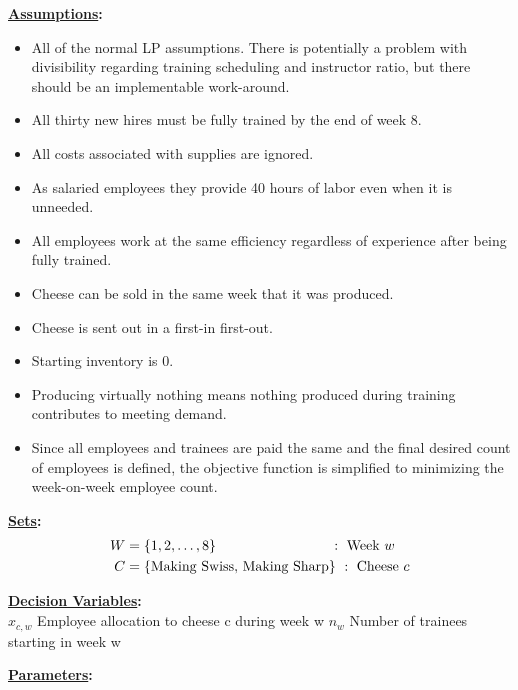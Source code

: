\documentclass[12pt]{amsart}
\begin{document}
\bigskip\bigskip

\textbf{\underline{Assumptions}:}
\begin{itemize}
	\item All of the normal LP assumptions. 
	There is potentially a problem with divisibility regarding training scheduling and instructor ratio,
	but there should be an implementable work-around. 
	\item All thirty new hires must be fully trained by the end of week 8.
	\item All costs associated with supplies are ignored.
	\item As salaried employees they provide 40 hours of labor even when it is unneeded.
	\item All employees work at the same efficiency regardless of experience after being fully trained.
	\item Cheese can be sold in the same week that it was produced.
	\item Cheese is sent out in a first-in first-out.
	\item Starting inventory is 0.
	\item Producing virtually nothing means nothing produced during training contributes to meeting demand.
	\item Since all employees and trainees are paid the same and the final desired count of employees is defined, 
	the objective function is simplified to minimizing the week-on-week employee count.
\end{itemize}


\textbf{\underline{Sets}:}
\begin{align*}
	W &= \{1,2,\ldots,8\}\hspace{19ex} :\  \text{Week } w \\
	C &= \{\text{Making Swiss},\, \text{Making Sharp}\}\ :\  \text{Cheese } c
\end{align*}

\textbf{\underline{Decision Variables}:} \\
\(x_{c,w}\) Employee allocation to cheese c during week w
\(n_w\) Number of trainees starting in week w

\textbf{\underline{Parameters}:} \\
\end{document}
